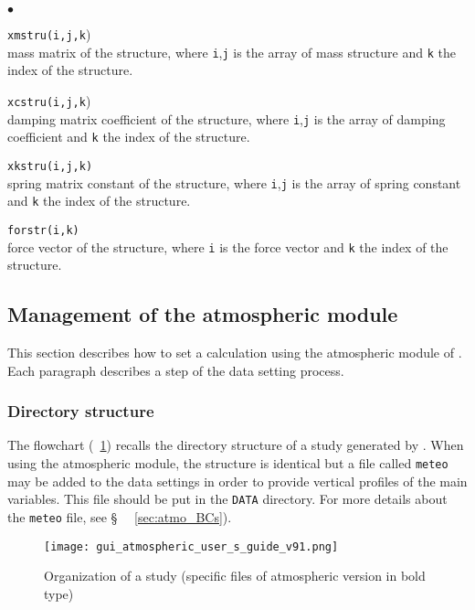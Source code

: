 \begin{list}{$\bullet$}{}

\item{\texttt{xmstru(i,j,k})} \\
{mass matrix of the structure, where \texttt{i},\texttt{j} is
the array of mass structure and \texttt{k} the index of the structure.}

\item{\texttt{xcstru(i,j,k})}\\
{damping matrix coefficient of the structure, where \texttt{i},\texttt{j} is the array of
damping coefficient and \texttt{k} the index of the structure.}

\item{\texttt{xkstru(i,j,k)}}\\
{spring matrix constant of the structure, where \texttt{i},\texttt{j} is the array of spring
constant and \texttt{k} the index of the structure.}

\item{\texttt{forstr(i,k)}}\\
{force vector of the structure, where \texttt{i} is the force vector and
\texttt{k} the index of the structure.}
\end{list}

\subsection{Management of the atmospheric module}

This section describes how to set a calculation using the atmospheric module
of \CS. Each paragraph describes a step of the data setting process.

\subsubsection{Directory structure}\label{sec:atmo_struct}
%
The flowchart (\figurename~\ref{fig:organisation}) recalls the directory
structure of a study generated by \CS .
When using the atmospheric module, the structure is identical but a file called
\texttt{meteo} may be added to the data settings in order to provide vertical
profiles of the main variables. This file should be put in the \texttt{DATA}
directory. For more details about the \texttt{meteo} file, see \S~
~\ref{sec:atmo_BCs}).
%
\begin{figure}[ht]
 \centerline{\texttt{[image: gui\_atmospheric\_user\_s\_guide\_v91.png]}}
 \caption{Organization of a study (specific files of atmospheric version in bold type)}
 \label{fig:organisation}
\end{figure}
%
